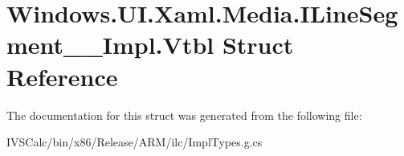 \hypertarget{struct_windows_1_1_u_i_1_1_xaml_1_1_media_1_1_i_line_segment_____impl_1_1_vtbl}{}\section{Windows.\+U\+I.\+Xaml.\+Media.\+I\+Line\+Segment\+\_\+\+\_\+\+Impl.\+Vtbl Struct Reference}
\label{struct_windows_1_1_u_i_1_1_xaml_1_1_media_1_1_i_line_segment_____impl_1_1_vtbl}


The documentation for this struct was generated from the following file\+:\begin{DoxyCompactItemize}
\item 
I\+V\+S\+Calc/bin/x86/\+Release/\+A\+R\+M/ilc/Impl\+Types.\+g.\+cs\end{DoxyCompactItemize}
